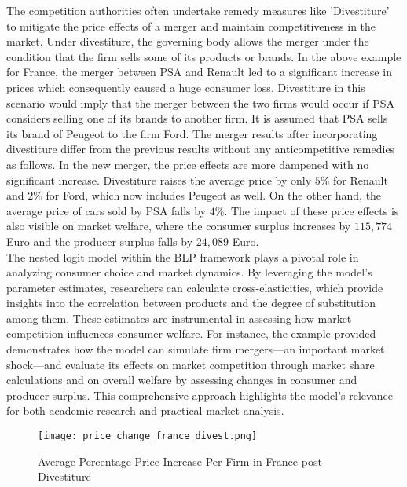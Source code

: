 \documentclass[a4paper,11pt]{article}
\begin{document}
   
    The competition authorities often undertake remedy measures like 'Divestiture' to mitigate the price effects of a merger and maintain competitiveness in the market. Under divestiture, the governing body allows the merger under the condition that the firm sells some of its products or brands. In the above example for France, the merger between PSA and Renault led to a significant increase in prices which consequently caused a huge consumer loss. Divestiture in this scenario would imply that the merger between the two firms would occur if PSA considers selling one of its brands to another firm. It is assumed that PSA sells its brand of Peugeot to the firm Ford. The merger results after incorporating divestiture differ from the previous results without any anticompetitive remedies as follows. In the new merger, the price effects are more dampened with no significant increase. Divestiture raises the average price by only $5\%$ for Renault and $2\%$ for Ford, which now includes Peugeot as well. On the other hand, the average price of cars sold by PSA falls by $4\%$. The impact of these price effects is also visible on market welfare, where the consumer surplus increases by $115,774$ Euro and the producer surplus falls by $24,089$ Euro.\\

    The nested logit model within the BLP framework plays a pivotal role in analyzing consumer choice and market dynamics. By leveraging the model's parameter estimates, researchers can calculate cross-elasticities, which provide insights into the correlation between products and the degree of substitution among them. These estimates are instrumental in assessing how market competition influences consumer welfare. For instance, the example provided demonstrates how the model can simulate firm mergers—an important market shock—and evaluate its effects on market competition through market share calculations and on overall welfare by assessing changes in consumer and producer surplus. This comprehensive approach highlights the model's relevance for both academic research and practical market analysis.\\
    
    \begin{figure}[htb]
        \centering
        \texttt{[image: price\_change\_france\_divest.png]}
        \caption{Average Percentage Price Increase Per Firm in France post Divestiture}
        \label{fig: Price Increase Divest}
    \end{figure}
\end{document}
